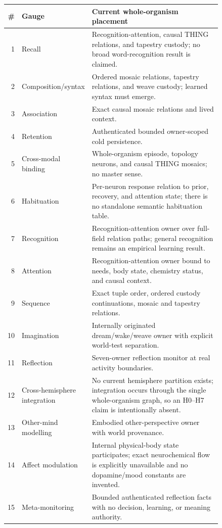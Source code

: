 \documentclass[11pt]{article}
\begin{document}
\begin{longtable}{r>{\raggedright\arraybackslash}p{0.20\linewidth}
  >{\raggedright\arraybackslash}p{0.64\linewidth}}
\toprule
\# & \textbf{Gauge} & \textbf{Current whole-organism placement}\\
\midrule
\endhead
1 & Recall & Recognition-attention, causal THING relations, and tapestry
custody; no broad word-recognition result is claimed.\\
2 & Composition/syntax & Ordered mosaic relations, tapestry relations, and
weave custody; learned syntax must emerge.\\
3 & Association & Exact causal mosaic relations and lived context.\\
4 & Retention & Authenticated bounded owner-scoped cold persistence.\\
5 & Cross-modal binding & Whole-organism episode, topology neurons, and
causal THING mosaics; no master sense.\\
6 & Habituation & Per-neuron response relation to prior, recovery, and
attention state; there is no standalone semantic habituation table.\\
7 & Recognition & Recognition-attention owner over full-field relation paths;
general recognition remains an empirical learning result.\\
8 & Attention & Recognition-attention owner bound to needs, body state,
chemistry status, and causal context.\\
9 & Sequence & Exact tuple order, ordered custody continuations, mosaic and
tapestry relations.\\
10 & Imagination & Internally originated dream/wake/weave owner with explicit
world-test separation.\\
11 & Reflection & Seven-owner reflection monitor at real activity
boundaries.\\
12 & Cross-hemisphere integration & No current hemisphere partition exists;
integration occurs through the single whole-organism graph, so an H0--H7
claim is intentionally absent.\\
13 & Other-mind modelling & Embodied other-perspective owner with world
provenance.\\
14 & Affect modulation & Internal physical-body state participates; exact
neurochemical flow is explicitly unavailable and no dopamine/mood constants
are invented.\\
15 & Meta-monitoring & Bounded authenticated reflection facts with no
decision, learning, or meaning authority.\\
\bottomrule
\end{longtable}
\end{document}
